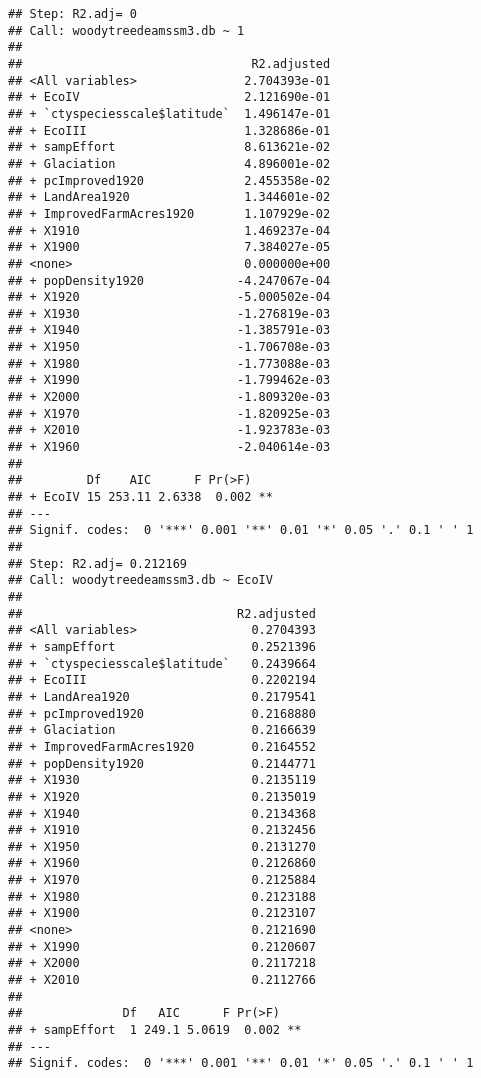 \documentclass[
]{article}
\begin{document}
\begin{verbatim}
## Step: R2.adj= 0 
## Call: woodytreedeamssm3.db ~ 1 
##  
##                                R2.adjusted
## <All variables>               2.704393e-01
## + EcoIV                       2.121690e-01
## + `ctyspeciesscale$latitude`  1.496147e-01
## + EcoIII                      1.328686e-01
## + sampEffort                  8.613621e-02
## + Glaciation                  4.896001e-02
## + pcImproved1920              2.455358e-02
## + LandArea1920                1.344601e-02
## + ImprovedFarmAcres1920       1.107929e-02
## + X1910                       1.469237e-04
## + X1900                       7.384027e-05
## <none>                        0.000000e+00
## + popDensity1920             -4.247067e-04
## + X1920                      -5.000502e-04
## + X1930                      -1.276819e-03
## + X1940                      -1.385791e-03
## + X1950                      -1.706708e-03
## + X1980                      -1.773088e-03
## + X1990                      -1.799462e-03
## + X2000                      -1.809320e-03
## + X1970                      -1.820925e-03
## + X2010                      -1.923783e-03
## + X1960                      -2.040614e-03
## 
##         Df    AIC      F Pr(>F)   
## + EcoIV 15 253.11 2.6338  0.002 **
## ---
## Signif. codes:  0 '***' 0.001 '**' 0.01 '*' 0.05 '.' 0.1 ' ' 1
## 
## Step: R2.adj= 0.212169 
## Call: woodytreedeamssm3.db ~ EcoIV 
##  
##                              R2.adjusted
## <All variables>                0.2704393
## + sampEffort                   0.2521396
## + `ctyspeciesscale$latitude`   0.2439664
## + EcoIII                       0.2202194
## + LandArea1920                 0.2179541
## + pcImproved1920               0.2168880
## + Glaciation                   0.2166639
## + ImprovedFarmAcres1920        0.2164552
## + popDensity1920               0.2144771
## + X1930                        0.2135119
## + X1920                        0.2135019
## + X1940                        0.2134368
## + X1910                        0.2132456
## + X1950                        0.2131270
## + X1960                        0.2126860
## + X1970                        0.2125884
## + X1980                        0.2123188
## + X1900                        0.2123107
## <none>                         0.2121690
## + X1990                        0.2120607
## + X2000                        0.2117218
## + X2010                        0.2112766
## 
##              Df   AIC      F Pr(>F)   
## + sampEffort  1 249.1 5.0619  0.002 **
## ---
## Signif. codes:  0 '***' 0.001 '**' 0.01 '*' 0.05 '.' 0.1 ' ' 1

\end{verbatim}
\end{document}
